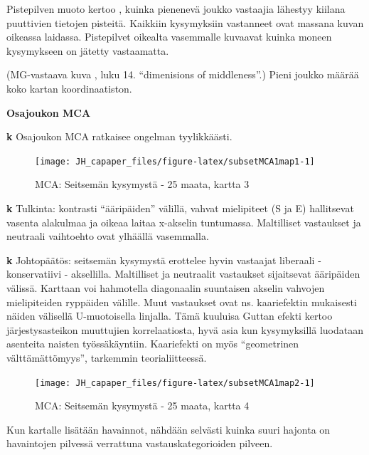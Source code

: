 \documentclass[
  finnish,
]{book}
\begin{document}
Pistepilven muoto kertoo , kuinka pienenevä joukko vastaajia lähestyy kiilana
puuttivien tietojen pisteitä. Kaikkiin kysymyksiin vastanneet ovat massana kuvan oikeassa laidassa. Pistepilvet
oikealta vasemmalle kuvaavat kuinka moneen kysymykseen on jätetty vastaamatta.

(MG-vastaava kuva \citep{RefWorks:doc:5a857a43e4b0ed2d44664d7c}, luku 14. ``dimenisions of middleness''.)
Pieni joukko määrää koko kartan koordinaatiston.

\textbf{Osajoukon MCA}

\textbf{k} Osajoukon MCA ratkaisee ongelman tyylikkäästi.

\begin{figure}

{\centering \texttt{[image: JH\_capaper\_files/figure-latex/subsetMCA1map1-1]} 

}

\caption{MCA: Seitsemän kysymystä - 25 maata, kartta 3}\label{fig:subsetMCA1map1}
\end{figure}

\textbf{k} Tulkinta: kontrasti ``ääripäiden'' välillä, vahvat mielipiteet (S ja E) hallitsevat vasenta alakulmaa ja oikeaa laitaa x-akselin tuntumassa. Maltilliset
vastaukset ja neutraali vaihtoehto ovat ylhäällä vasemmalla.

\textbf{k} Johtopäätös: seitsemän kysymystä erottelee hyvin vastaajat
liberaali - konservatiivi - aksellilla. Maltilliset ja neutraalit vastaukset sijaitsevat ääripäiden välissä. Karttaan voi hahmotella diagonaalin suuntaisen
akselin vahvojen mielipiteiden ryppäiden välille. Muut vastaukset ovat
ns. kaariefektin mukaisesti näiden välisellä U-muotoisella linjalla. Tämä kuuluisa Guttan efekti kertoo järjestysasteikon muuttujien korrelaatiosta, hyvä asia kun
kysymyksillä luodataan asenteita naisten työssäkäyntiin. Kaariefekti on myös ``geometrinen välttämättömyys'', tarkemmin teorialiitteessä.

\begin{figure}

{\centering \texttt{[image: JH\_capaper\_files/figure-latex/subsetMCA1map2-1]} 

}

\caption{MCA: Seitsemän kysymystä - 25 maata, kartta 4}\label{fig:subsetMCA1map2}
\end{figure}

Kun kartalle lisätään havainnot, nähdään selvästi kuinka suuri hajonta on havaintojen
pilvessä verrattuna vastauskategorioiden pilveen.
\end{document}
